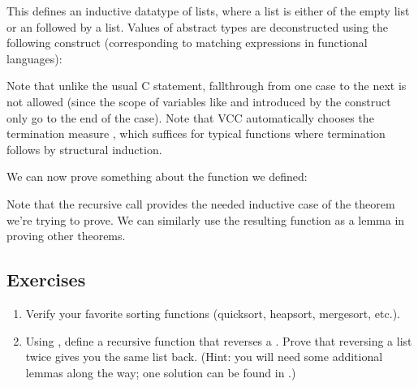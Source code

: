 
This defines an inductive datatype of lists, where a list is either of
the empty list  or an  followed by a
list. Values of abstract types are deconstructed using the following
 construct (corresponding to matching expressions in
functional languages):


Note that unlike the usual C  statement, fallthrough from
one case to the next is not allowed (since the scope of variables like
 and  introduced by the  construct only go to
the end of the case). Note that VCC automatically chooses the
termination measure , which
suffices for typical functions where termination follows by structural
induction. 

We can now prove something about the function we defined:


Note that the recursive call provides the needed inductive case of the
theorem we're trying to prove. We can similarly use the resulting
function as a lemma in proving other theorems. 


\subsection*{Exercises}
\begin{enumerate}

\item 
Verify your favorite sorting functions (quicksort, heapsort,
mergesort, etc.).
\item
Using , define a recursive function that reverses a
. Prove that reversing a list twice gives you the same list
back. (Hint: you will need some additional lemmas along the way; one
solution can be found in .)
\end{enumerate}
